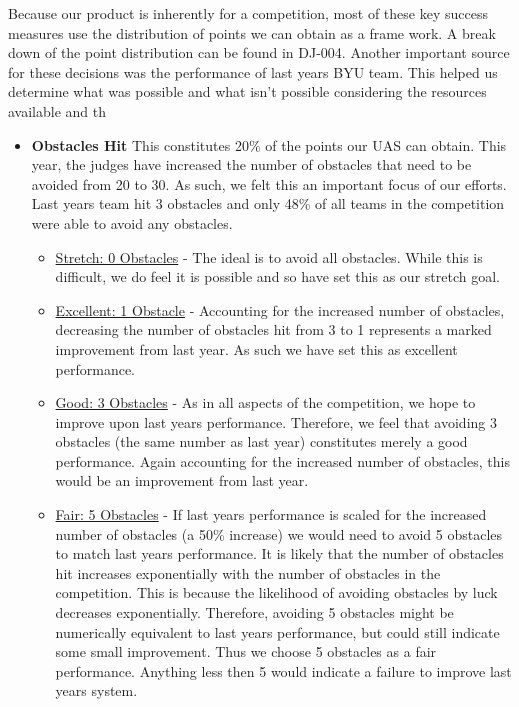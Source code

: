\documentclass[]{auvsi_doc}
\begin{document}
Because our product is inherently for a competition, most of these key success measures use the distribution of points we can obtain as a frame work. A break down of the point distribution can be found in DJ-004. Another important source for these decisions was the performance of last years BYU team. This helped us determine what was possible and what isn't possible considering the resources available and th

\begin{itemize}
\item \textbf{Obstacles Hit} This constitutes 20\% of the points our UAS can obtain. This year, the judges have increased the number of obstacles that need to be avoided from 20 to 30. As such, we felt this an important focus of our efforts. Last years team hit 3 obstacles and only 48\% of all teams in the competition were able to avoid any obstacles. 
	\begin{itemize}
	\item \underline{Stretch: 0 Obstacles} - The ideal is to avoid all obstacles. While this is difficult, we do feel it is possible and so have set this as our stretch goal.
	\item \underline{Excellent: 1 Obstacle} -  Accounting for the increased number of obstacles, decreasing the number of obstacles hit from 3 to 1 represents a marked improvement from last year. As such we have set this as excellent performance.
	\item \underline{Good: 3 Obstacles} -  As in all aspects of the competition, we hope to improve upon last years performance. Therefore, we feel that avoiding 3 obstacles (the same number as last year) constitutes merely a good performance. Again accounting for the increased number of obstacles, this would be an improvement from last year.
	\item  \underline{Fair: 5 Obstacles} -  If last years performance is scaled for the increased number of obstacles (a 50\% increase) we would need to avoid 5 obstacles to match last years performance. It is likely that the number of obstacles hit increases exponentially with the number of obstacles in the competition. This is because the likelihood of avoiding obstacles by luck decreases exponentially. Therefore, avoiding 5 obstacles might be numerically equivalent to last years performance, but could still indicate some small improvement. Thus we choose 5 obstacles as a fair performance. Anything less then 5 would indicate a failure to improve last years system.
	\end{itemize}

\end{itemize}
\end{document}
